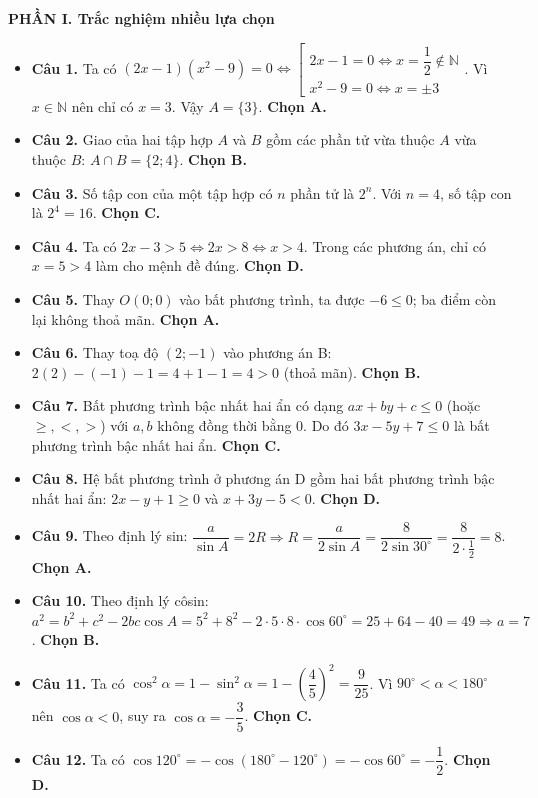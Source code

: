 \documentclass[12pt,a4paper]{article}
\begin{document}
\textbf{\large PHẦN I. Trắc nghiệm nhiều lựa chọn}
\begin{itemize}[leftmargin=0.6cm, itemsep=3pt]
    \item \textbf{Câu 1.} Ta có $(2x - 1)(x^2 - 9) = 0 \Leftrightarrow \left[\begin{array}{l} 2x - 1 = 0 \Leftrightarrow x = \dfrac{1}{2} \notin \mathbb{N} \\ x^2 - 9 = 0 \Leftrightarrow x = \pm 3 \end{array}\right.$. Vì $x \in \mathbb{N}$ nên chỉ có $x = 3$. Vậy $A = \{3\}$. \textbf{Chọn A.}
    \item \textbf{Câu 2.} Giao của hai tập hợp $A$ và $B$ gồm các phần tử vừa thuộc $A$ vừa thuộc $B$: $A \cap B = \{2; 4\}$. \textbf{Chọn B.}
    \item \textbf{Câu 3.} Số tập con của một tập hợp có $n$ phần tử là $2^n$. Với $n = 4$, số tập con là $2^4 = 16$. \textbf{Chọn C.}
    \item \textbf{Câu 4.} Ta có $2x - 3 > 5 \Leftrightarrow 2x > 8 \Leftrightarrow x > 4$. Trong các phương án, chỉ có $x = 5 > 4$ làm cho mệnh đề đúng. \textbf{Chọn D.}
    \item \textbf{Câu 5.} Thay $O(0; 0)$ vào bất phương trình, ta được $-6 \le 0$; ba điểm còn lại không thoả mãn. \textbf{Chọn A.}
    \item \textbf{Câu 6.} Thay toạ độ $(2; -1)$ vào phương án B: $2(2) - (-1) - 1 = 4 + 1 - 1 = 4 > 0$ (thoả mãn). \textbf{Chọn B.}
    \item \textbf{Câu 7.} Bất phương trình bậc nhất hai ẩn có dạng $ax + by + c \le 0$ (hoặc $\ge, <, >$) với $a, b$ không đồng thời bằng 0. Do đó $3x - 5y + 7 \le 0$ là bất phương trình bậc nhất hai ẩn. \textbf{Chọn C.}
    \item \textbf{Câu 8.} Hệ bất phương trình ở phương án D gồm hai bất phương trình bậc nhất hai ẩn: $2x - y + 1 \ge 0$ và $x + 3y - 5 < 0$. \textbf{Chọn D.}
    \item \textbf{Câu 9.} Theo định lý sin: $\dfrac{a}{\sin A} = 2R \Rightarrow R = \dfrac{a}{2\sin A} = \dfrac{8}{2 \sin 30^\circ} = \dfrac{8}{2 \cdot \frac{1}{2}} = 8$. \textbf{Chọn A.}
    \item \textbf{Câu 10.} Theo định lý côsin: $a^2 = b^2 + c^2 - 2bc \cos A = 5^2 + 8^2 - 2 \cdot 5 \cdot 8 \cdot \cos 60^\circ = 25 + 64 - 40 = 49 \Rightarrow a = 7$. \textbf{Chọn B.}
    \item \textbf{Câu 11.} Ta có $\cos^2 \alpha = 1 - \sin^2 \alpha = 1 - \left(\dfrac{4}{5}\right)^2 = \dfrac{9}{25}$. Vì $90^\circ < \alpha < 180^\circ$ nên $\cos \alpha < 0$, suy ra $\cos \alpha = -\dfrac{3}{5}$. \textbf{Chọn C.}
    \item \textbf{Câu 12.} Ta có $\cos 120^\circ = -\cos(180^\circ - 120^\circ) = -\cos 60^\circ = -\dfrac{1}{2}$. \textbf{Chọn D.}
\end{itemize}
\end{document}
